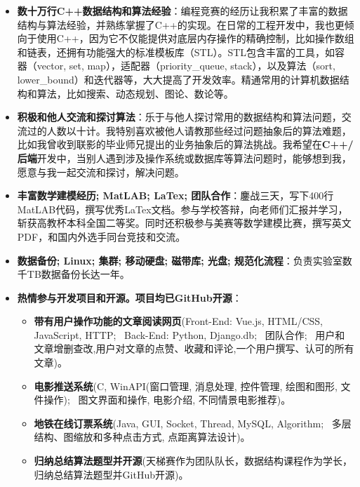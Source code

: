 \documentclass{resume}
\begin{document}
\begin{itemize}
	\item \textbf{数十万行C++数据结构和算法经验}：编程竞赛的经历让我积累了丰富的数据结构与算法经验，并熟练掌握了C++的实现。在日常的工程开发中，我也更倾向于使用C++，因为它不仅能提供对底层内存操作的精确控制，比如操作数组和链表，还拥有功能强大的标准模板库（STL）。STL包含丰富的工具，如容器（vector, set, map），适配器（priority\_queue, stack），以及算法（sort, lower\_bound）和迭代器等，大大提高了开发效率。精通常用的计算机数据结构和算法，比如搜索、动态规划、图论、数论等。
	\item \textbf{积极和他人交流和探讨算法}：乐于与他人探讨常用的数据结构和算法问题，交流过的人数以十计。我特别喜欢被他人请教那些经过问题抽象后的算法难题，比如我曾收到联影的毕业师兄提出的业务抽象后的算法挑战。我希望在\textbf{C++/后端}开发中，当别人遇到涉及操作系统或数据库等算法问题时，能够想到我，愿意与我一起交流和探讨，解决问题。
	\item \textbf{丰富数学建模经历; MatLAB; LaTex; 团队合作}：鏖战三天，写下400行MatLAB代码，撰写优秀LaTex文档。参与学校答辩，向老师们汇报并学习，斩获高教杯本科全国二等奖。同时还积极参与美赛等数学建模比赛，撰写英文PDF，和国内外选手同台竞技和交流。
	\item \textbf{数据备份; Linux; 集群; 移动硬盘; 磁带库; 光盘; 规范化流程}：负责实验室数千TB数据备份长达一年。
	\item \textbf{热情参与开发项目和开源。项目均已GitHub开源}：
		\begin{itemize}
			\item \textbf{带有用户操作功能的文章阅读网页}(Front-End: Vue.js, HTML/CSS, JavaScript, HTTP; \, Back-End: Python, Django.db; \, 团队合作; \, 用户和文章增删查改,用户对文章的点赞、收藏和评论,一个用户撰写、认可的所有文章)。
			\item \textbf{电影推送系统}(C, WinAPI(窗口管理, 消息处理, 控件管理, 绘图和图形, 文件操作); \, 图文界面和操作, 电影介绍, 不同情景电影推荐)。
			\item \textbf{地铁在线订票系统}(Java, GUI, Socket, Thread, MySQL, Algorithm; \, 多层结构、图缩放和多种点击方式, 点距离算法设计)。
			\item \textbf{归纳总结算法题型并开源}(天梯赛作为团队队长，数据结构课程作为学长，归纳总结算法题型并GitHub开源)。
		\end{itemize}
\end{itemize}
\end{document}
